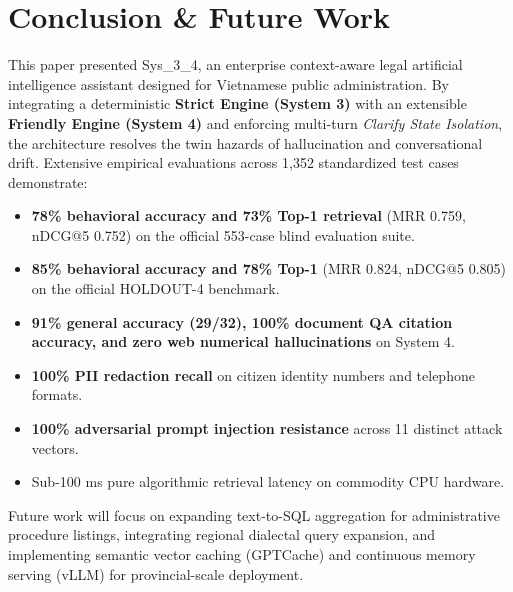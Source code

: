 \documentclass[11pt,a4paper]{article}
\newcommand{\sys}{\mbox{Sys\_3\_4}}
\begin{document}
\section{Conclusion \& Future Work}
This paper presented \sys{}, an enterprise context-aware legal artificial intelligence assistant designed
for Vietnamese public administration. By integrating a deterministic \textbf{Strict Engine (System 3)}
with an extensible \textbf{Friendly Engine (System 4)} and enforcing multi-turn \emph{Clarify State
Isolation}, the architecture resolves the twin hazards of hallucination and conversational drift.
Extensive empirical evaluations across 1,352 standardized test cases demonstrate:
\begin{itemize}
\item \textbf{78\% behavioral accuracy and 73\% Top-1 retrieval} (MRR 0.759, nDCG@5 0.752) on the official
553-case blind evaluation suite.
\item \textbf{85\% behavioral accuracy and 78\% Top-1} (MRR 0.824, nDCG@5 0.805) on the official
HOLDOUT-4 benchmark.
\item \textbf{91\% general accuracy (29/32), 100\% document QA citation accuracy, and zero web numerical
hallucinations} on System 4.
\item \textbf{100\% PII redaction recall} on citizen identity numbers and telephone formats.
\item \textbf{100\% adversarial prompt injection resistance} across 11 distinct attack vectors.
\item Sub-100 ms pure algorithmic retrieval latency on commodity CPU hardware.
\end{itemize}
Future work will focus on expanding text-to-SQL aggregation for administrative procedure listings,
integrating regional dialectal query expansion, and implementing semantic vector caching (GPTCache) and
continuous memory serving (vLLM) for provincial-scale deployment.
\end{document}
